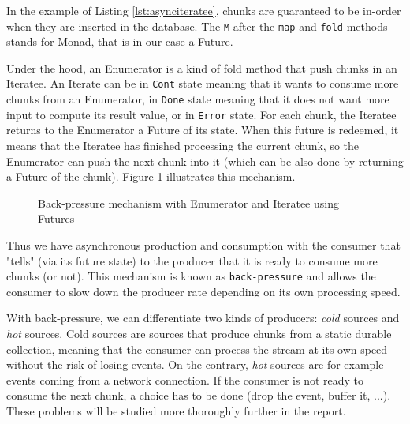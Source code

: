 In the example of Listing \ref{lst:asynciteratee}, chunks are guaranteed to be in-order when they are inserted in the database. The \verb|M| after
the \verb|map| and \verb|fold| methods stands for Monad, that is in our case a Future.

Under the hood, an Enumerator is a kind of fold method that push chunks in an Iteratee. An Iterate can be in \verb|Cont| state meaning that it wants to consume more 
chunks from an Enumerator, in \verb|Done| state
meaning that it does not want more input to compute its result value, or in \verb|Error| state. For each chunk, the Iteratee returns to the Enumerator
a Future of its state. When this future is redeemed, it means that the Iteratee has finished processing the current chunk, so the Enumerator can 
push the next chunk into it (which can be also done by returning a Future of the chunk). Figure \ref{fig:itenum} illustrates this mechanism.

\begin{figure}[h]
  \begin{center} 
    \caption{Back-pressure mechanism with Enumerator and Iteratee using Futures}
    \label{fig:itenum}
  \end{center}
\end{figure}

Thus we have asynchronous production and consumption with the consumer that "tells" (via its future state) to the producer that it is ready to 
consume more chunks (or not). This mechanism is known as \verb|back-pressure| and allows the consumer to slow down the producer rate depending on its 
own processing speed. 

With back-pressure, we can differentiate two kinds of producers: \textit{cold} sources and \textit{hot} sources. Cold sources are sources that
produce chunks from a static durable collection, meaning that the consumer can process the stream at its own speed without the risk of losing events.
On the contrary, \textit{hot} sources are for example events coming from a network connection. If the consumer is not ready to consume the next chunk,
a choice has to be done (drop the event, buffer it, ...). These problems will be studied more thoroughly further in the report.
\\

